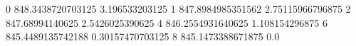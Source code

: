 0 848.3438720703125 3.196533203125
1 847.8984985351562 2.75115966796875
2 847.68994140625 2.5426025390625
4 846.2554931640625 1.108154296875
6 845.4489135742188 0.30157470703125
8 845.1473388671875 0.0
